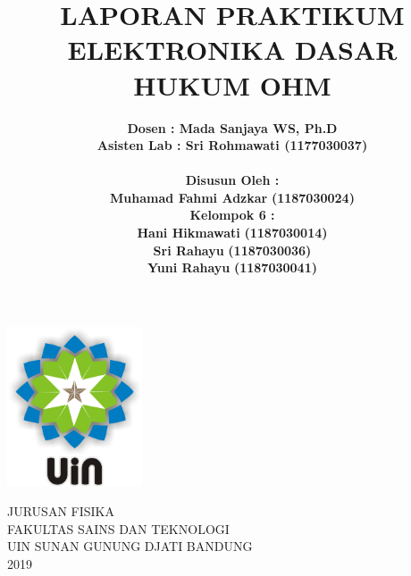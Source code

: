 \documentclass[12pt,a4paper]{article}
\begin{document}
\onehalfspacing
\begin{titlepage}

\title{\textbf{LAPORAN PRAKTIKUM ELEKTRONIKA DASAR
\\ HUKUM OHM }}  %
\author{\textbf {Dosen : Mada Sanjaya WS, Ph.D }
\\ \textbf{Asisten Lab : Sri Rohmawati (1177030037)}
\\ \textbf{ }
\\ \textbf{Disusun Oleh :}
\\ \textbf{Muhamad Fahmi Adzkar} \textbf {(1187030024)}
\\ \textbf{Kelompok 6 :}
\\ \textbf{Hani Hikmawati} \textbf {(1187030014)}
\\ \textbf{Sri Rahayu} \textbf {(1187030036)}
\\ \textbf{Yuni Rahayu} \textbf {(1187030041)}}

\maketitle
\begin{center}
\vspace{1cm}
\includegraphics[width=4cm]{uin.png}
\vspace{1cm}

JURUSAN FISIKA\\
FAKULTAS SAINS DAN TEKNOLOGI\\
UIN SUNAN GUNUNG DJATI BANDUNG\\
2019\\
\end{center}
\end{titlepage}
\end{document}
